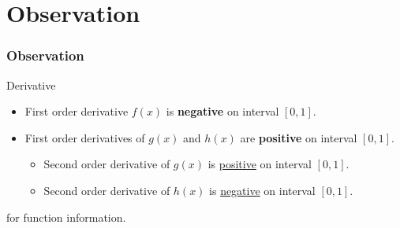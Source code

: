 \documentclass[mathserif]{beamer}
\begin{document}
\section{Observation}
\begin{frame}
\frametitle{Observation}
\begin{block}{Derivative}
\begin{itemize}
\item First order derivative $f(x)$ is \textbf{negative} on interval $[0,1]$.
\item First order derivatives of $g(x)$ and $h(x)$ are \textbf{positive} on interval $[0,1]$.
\begin{itemize}
\item Second order derivative of $g(x)$ is \underline{positive} on interval $[0,1]$.
\item Second order derivative of $h(x)$ is \underline{negative} on interval $[0,1]$.
\end{itemize}
\end{itemize}
\end{block}
\vspace{1cm}
\hyperlink{slide3}{ } for function information.

\end{frame}

\end{document}
